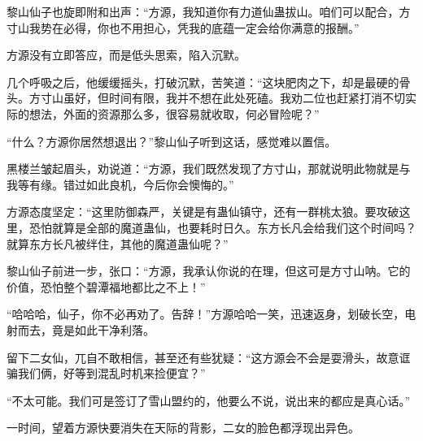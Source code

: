 \begin{this_body}
黎山仙子也旋即附和出声：“方源，我知道你有力道仙蛊拔山。咱们可以配合，方寸山我势在必得，你也不用担心，凭我的底蕴一定会给你满意的报酬。”

方源没有立即答应，而是低头思索，陷入沉默。

几个呼吸之后，他缓缓摇头，打破沉默，苦笑道：“这块肥肉之下，却是最硬的骨头。方寸山虽好，但时间有限，我并不想在此处死磕。我劝二位也赶紧打消不切实际的想法，外面的资源那么多，很容易就收取，何必冒险呢？”

“什么？方源你居然想退出？”黎山仙子听到这话，感觉难以置信。

黑楼兰皱起眉头，劝说道：“方源，我们既然发现了方寸山，那就说明此物就是与我等有缘。错过如此良机，今后你会懊悔的。”

方源态度坚定：“这里防御森严，关键是有蛊仙镇守，还有一群桃太狼。要攻破这里，恐怕就算是全部的魔道蛊仙，也要耗时日久。东方长凡会给我们这个时间吗？就算东方长凡被绊住，其他的魔道蛊仙呢？”

黎山仙子前进一步，张口：“方源，我承认你说的在理，但这可是方寸山呐。它的价值，恐怕整个碧潭福地都比之不上！”

“哈哈哈，仙子，你不必再劝了。告辞！”方源哈哈一笑，迅速返身，划破长空，电射而去，竟是如此干净利落。

留下二女仙，兀自不敢相信，甚至还有些犹疑：“这方源会不会是耍滑头，故意诓骗我们俩，好等到混乱时机来捡便宜？”

“不太可能。我们可是签订了雪山盟约的，他要么不说，说出来的都应是真心话。”

一时间，望着方源快要消失在天际的背影，二女的脸色都浮现出异色。

\end{this_body}

